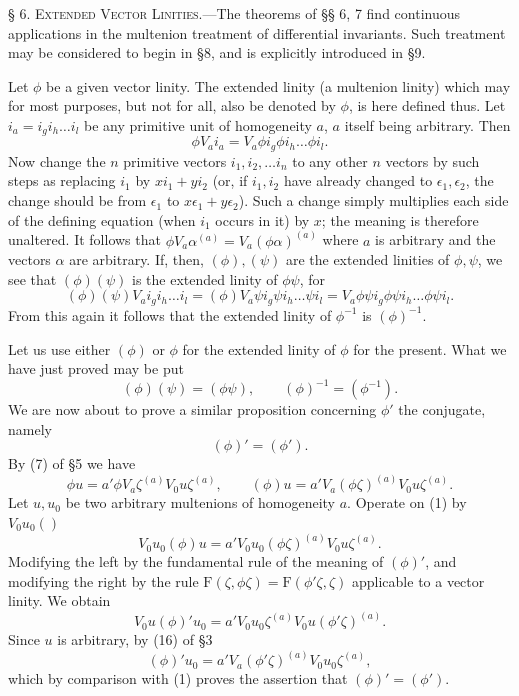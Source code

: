 \documentclass[11pt]{article}
\begin{document}
\noindent\textsc{§ 6. Extended Vector Linities.}---The theorems of §§ 6, 7 find continuous applications in the multenion treatment of differential invariants. Such treatment may be considered to begin in §8, and is explicitly introduced in §9.

\indent Let $\phi$ be a given vector linity. The extended linity (a multenion linity) which may for most purposes, but not for all, also be denoted by $\phi$, is here defined thus. Let $i_a=i_gi_h\ldots i_l$ be any primitive unit of homogeneity $a$, $a$ itself being arbitrary. Then
\[\phi V_ai_a=V_a\phi i_g\phi i_h\ldots\phi i_l.\]
Now change the $n$ primitive vectors $i_1,i_2,\ldots i_n$ to any other $n$ vectors by such steps as replacing $i_1$ by $xi_1+yi_2$ (or, if $i_1,i_2$ have already changed to $\epsilon_1,\epsilon_2$, the change should be from $\epsilon_1$ to $x\epsilon_1+y\epsilon_2$). Such a change simply multiplies each side of the defining equation (when $i_1$ occurs in it) by $x$; the meaning is therefore unaltered. It follows that $\phi V_a\alpha^{(a)}=V_a(\phi\alpha)^{(a)}$ where $a$ is arbitrary and the vectors $\alpha$ are arbitrary. If, then, $(\phi),(\psi)$ are the extended linities of $\phi,\psi$, we see that $(\phi)(\psi)$ is the extended linity of $\phi\psi$, for
\[(\phi)(\psi)V_ai_gi_h\ldots i_l=(\phi)V_a\psi i_g\psi i_h\ldots\psi i_l=V_a\phi\psi i_g\phi\psi i_h\ldots\phi\psi i_l.\]
From this again it follows that the extended linity of $\phi^{-1}$ is $(\phi)^{-1}$.

Let us use either $(\phi)$ or $\phi$ for the extended linity of $\phi$ for the present. What we have just proved may be put
\[(\phi)(\psi)=(\phi\psi),\qquad (\phi)^{-1}=(\phi^{-1}).\]
We are now about to prove a similar proposition concerning $\phi'$ the conjugate, namely
\[(\phi)'=(\phi').\]
By (7) of §5 we have
\begin{equation}\phi u=a'\phi V_a\zeta^{(a)}V_0u\zeta^{(a)},\qquad (\phi)u=a'V_a(\phi\zeta)^{(a)}V_0u\zeta^{(a)}.\tag{1}\end{equation}
Let $u,u_0$ be two arbitrary multenions of homogeneity $a$. Operate on (1) by $V_0u_0()$
\[V_0u_0(\phi)u=a'V_0u_0(\phi\zeta)^{(a)}V_0u\zeta^{(a)}.\]
Modifying the left by the fundamental rule of the meaning of $(\phi)'$, and modifying the right by the rule $\mathrm F(\zeta,\phi\zeta)=\mathrm F(\phi'\zeta,\zeta)$ applicable to a vector linity. We obtain
\[V_0u(\phi)'u_0=a'V_0u_0\zeta^{(a)}V_0u(\phi'\zeta)^{(a)}.\]
Since $u$ is arbitrary, by (16) of §3
\[(\phi)'u_0=a'V_a(\phi'\zeta)^{(a)}V_0u_0\zeta^{(a)},\]
which by comparison with (1) proves the assertion that $(\phi)'=(\phi')$.
\end{document}
